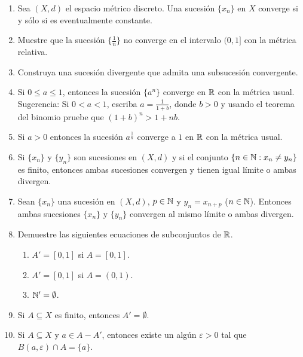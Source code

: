 \begin{enumerate}
    \item Sea $(X, d)$ el espacio métrico discreto. Una sucesión $\{x_n\}$ en $X$ converge si y sólo si es eventualmente constante.
    
    \item Muestre que la sucesión $\{\frac{1}{n}\}$ no converge en el intervalo $(0, 1]$ con la métrica relativa.

    \item Construya una sucesión divergente que admita una subsucesión convergente.
    
    \item Si $0 \leq a \leq 1$, entonces la sucesión $\{a^n\}$ converge en $\mathbb{R}$ con la métrica usual. Sugerencia: Si $0 < a < 1$, escriba $a = \frac{1}{1+b}$, donde $b > 0$ y usando el teorema del binomio pruebe que $(1 + b)^n > 1 + nb$.
    
    \item Si $a > 0$ entonces la sucesión $a^{\frac{1}{n}}$ converge a $1$ en $\mathbb{R}$ con la métrica usual.
    
    \item Si $\{x_n\}$ y $\{y_n\}$ son sucesiones en $(X, d)$ y si el conjunto $\{n \in \mathbb{N} : x_n \neq y_n\}$ es finito, entonces ambas sucesiones convergen y tienen igual límite o ambas divergen.
    
    \item Sean $\{x_n\}$ una sucesión en $(X, d)$, $p \in \mathbb{N}$ y $y_n = x_{n+p}$ ($n \in \mathbb{N}$). Entonces ambas sucesiones $\{x_n\}$ y $\{y_n\}$ convergen al mismo límite o ambas divergen.
    
    \item Demuestre las siguientes ecuaciones de subconjuntos de $\mathbb{R}$.
    \begin{enumerate}
        \item[a)] $A' = [0,1]$ \hspace{1cm} si $A = [0,1]$.
        \item[b)] $A' = [0,1]$ \hspace{1cm} si $A = (0,1)$.
        \item[c)] $\mathbb{N}' = \emptyset$.
    \end{enumerate}
    
    \item Si $A \subseteq X$ es finito, entonces $A' = \emptyset$.
    
    \item Si $A \subseteq X$ y $a \in A - A'$, entonces existe un algún $\varepsilon > 0$ tal que $B(a, \varepsilon) \cap A = \{a\}$.
    

\end{enumerate}
